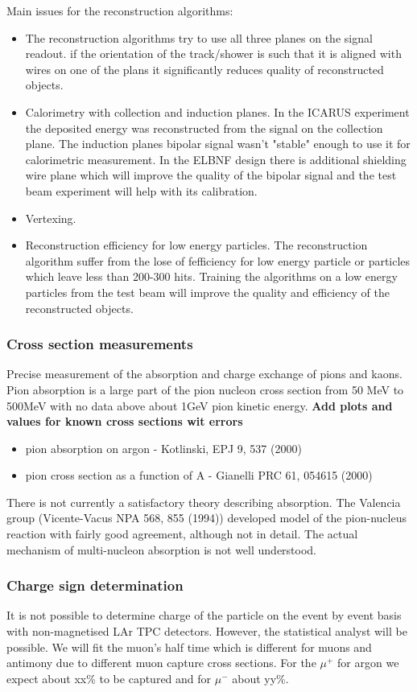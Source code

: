 Main issues for the reconstruction algorithms:
\begin{itemize}
\item The reconstruction algorithms try to use all three planes on the signal readout. if the orientation of the track/shower is such that it is aligned with wires on one of the plans it significantly reduces quality of reconstructed objects. 
\item Calorimetry with collection and induction planes. In the ICARUS experiment the deposited energy was reconstructed from the signal on the collection plane. The induction planes bipolar signal wasn't "stable" enough to use it for calorimetric measurement. In the ELBNF design there is additional shielding  wire plane which will improve the quality of the bipolar signal and the  test beam experiment will help with its calibration.
\item   Vertexing.
\item Reconstruction efficiency for low energy particles. The reconstruction algorithm suffer from the lose of fefficiency for low energy particle or particles which leave less than 200-300 hits. Training the algorithms on a low energy particles from the test beam will improve the quality and efficiency of the reconstructed objects.
\end{itemize}



\subsubsection{Cross section measurements}
Precise measurement of the  absorption and charge exchange of pions and kaons. Pion absorption is a large part of the pion nucleon cross section from 50 MeV to 500MeV with no data above about 1GeV pion kinetic energy. 
{\bf Add plots and values for known cross sections wit errors} 
\begin{itemize}
\item pion absorption on argon - Kotlinski, EPJ 9, 537 (2000)
\item pion cross section as a function of A - Gianelli PRC 61, 054615 (2000)
\end{itemize}
There is not currently a satisfactory theory describing absorption. The Valencia group (Vicente-Vacus NPA 568, 855 (1994)) developed model of    the pion-nucleus reaction with fairly good agreement, although not in detail. The actual  mechanism of multi-nucleon absorption
 is not well understood. 
 
\subsubsection{Charge sign determination}
It is not possible to determine charge of the particle on the event by event basis with non-magnetised LAr TPC detectors. However, the statistical analyst will be possible. We will fit the muon's half time which is different for muons and antimony due to different muon capture cross sections. For the $\mu^+$ for argon we expect about xx\% to be captured and for $\mu^-$ about yy\%. 

